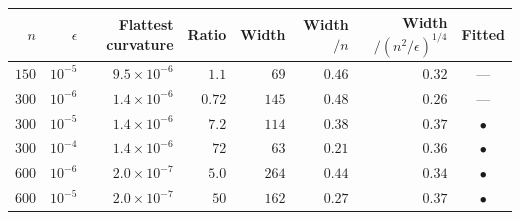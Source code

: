 \begin{tabular}{rrrrrrrc}
\toprule
$n$ & $\epsilon$ & Flattest curvature & Ratio & Width & Width$/n$ & Width$/(n^2/\epsilon)^{1/4}$ & Fitted \tabularnewline
\midrule
$150$ & $10^{-5}$ & $9.5\times10^{-6}$ & $1.1$ & $69$ & $0.46$ & $0.32$ & --- \tabularnewline
$300$ & $10^{-6}$ & $1.4\times10^{-6}$ & $0.72$ & $145$ & $0.48$ & $0.26$ & --- \tabularnewline
$300$ & $10^{-5}$ & $1.4\times10^{-6}$ & $7.2$ & $114$ & $0.38$ & $0.37$ & $\bullet$ \tabularnewline
$300$ & $10^{-4}$ & $1.4\times10^{-6}$ & $72$ & $63$ & $0.21$ & $0.36$ & $\bullet$ \tabularnewline
$600$ & $10^{-6}$ & $2.0\times10^{-7}$ & $5.0$ & $264$ & $0.44$ & $0.34$ & $\bullet$ \tabularnewline
$600$ & $10^{-5}$ & $2.0\times10^{-7}$ & $50$ & $162$ & $0.27$ & $0.37$ & $\bullet$ \tabularnewline
\bottomrule
\end{tabular}
